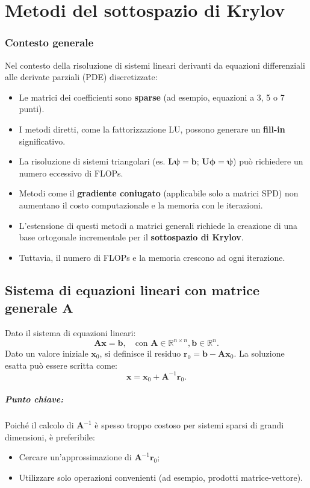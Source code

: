 \chapter{Metodi del sottospazio di Krylov}
\subsection{Contesto generale}
Nel contesto della risoluzione di sistemi lineari derivanti da equazioni differenziali alle derivate parziali (PDE) discretizzate:
\begin{itemize}
	\item Le matrici dei coefficienti sono \textbf{sparse} (ad esempio, equazioni a 3, 5 o 7 punti).
	\item I metodi diretti, come la fattorizzazione LU, possono generare un \textbf{fill-in} significativo.
	\item La risoluzione di sistemi triangolari (es. $\mathbf{L}\mathbf{\psi} = \mathbf{b}$; $\mathbf{U}\mathbf{\phi} = \mathbf{\psi}$) può richiedere un numero eccessivo di FLOPs.
	\item Metodi come il \textbf{gradiente coniugato} (applicabile solo a matrici SPD) non aumentano il costo computazionale e la memoria con le iterazioni.
	\item L'estensione di questi metodi a matrici generali richiede la creazione di una base ortogonale incrementale per il \textbf{sottospazio di Krylov}.
	\item Tuttavia, il numero di FLOPs e la memoria crescono ad ogni iterazione.
\end{itemize}

\section{Sistema di equazioni lineari con matrice generale $\mathbf{A}$}
Dato il sistema di equazioni lineari:
\[
\mathbf{A} \mathbf{x} = \mathbf{b}, \quad \text{con } \mathbf{A} \in \mathbb{R}^{n \times n}, \mathbf{b} \in \mathbb{R}^{n}. 
\]
Dato un valore iniziale $\mathbf{x}_0$, si definisce il residuo $\mathbf{r}_0 = \mathbf{b} - \mathbf{A} \mathbf{x}_0$. La soluzione esatta può essere scritta come:
\[
\mathbf{x} = \mathbf{x}_0 + \mathbf{A}^{-1} \mathbf{r}_0. 
\]
\paragraph{Punto chiave:}
Poiché il calcolo di $\mathbf{A}^{-1}$ è spesso troppo costoso per sistemi sparsi di grandi dimensioni, è preferibile:
\begin{itemize}
	\item Cercare un'approssimazione di $\mathbf{A}^{-1} \mathbf{r}_0$;
	\item Utilizzare solo operazioni convenienti (ad esempio, prodotti matrice-vettore).
\end{itemize}

